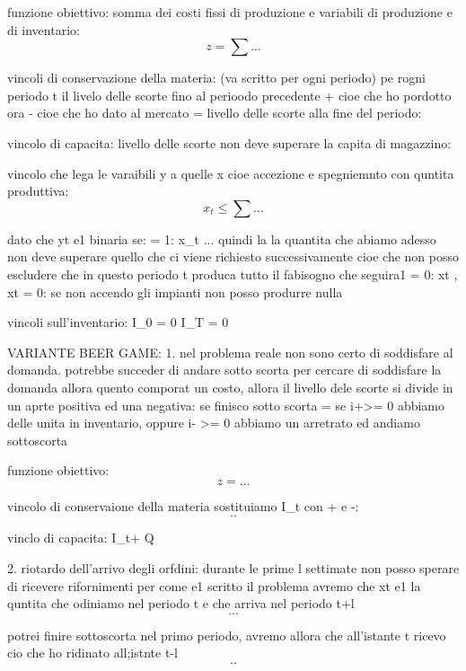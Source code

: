 funzione obiettivo:
somma dei costi fissi di produzione e variabili di produzione e di inventario:
$$z = \sum ...$$


vincoli di conservazione della materia: (va scritto per ogni periodo)
pe rogni periodo t il livelo delle scorte fino al perioodo precedente + cioe che ho pordotto ora - cioe che ho dato al mercato = livello delle scorte alla fine del periodo:


vincolo di capacita:
livello delle scorte non deve superare la capita di magazzino:


vincolo che lega le varaibili y a quelle x cioe accezione e spegniemnto con quntita produttiva:
$$x_t \leq \sum ...$$

dato che yt e1 binaria se: 
= 1: x_t \leq \sum ... quindi la la quantita che abiamo adesso non deve superare quello che ci viene richiesto successivamente cioe che non posso escludere che in questo periodo t produca tutto il fabisogno che seguira1
= 0: xt , xt = 0: se non accendo gli impianti non posso produrre nulla


vincoli sull'inventario:
I_0 = 0
I_T = 0





VARIANTE BEER GAME:
1. nel problema reale non sono certo di soddisfare al domanda. potrebbe succeder di andare sotto scorta per cercare di soddisfare la domanda allora quento comporat un costo, allora il livello dele scorte si divide in un aprte positiva ed una negativa:  se finisco sotto scorta = se i+>= 0 abbiamo delle unita in inventario, oppure i- >= 0 abbiamo un arretrato ed andiamo sottoscorta

funzione obiettivo:
$$z = ...$$

vincolo di conservaione della materia sostituiamo I_t con + e -:
$$..$$

vinclo di capacita:
I_t+ \leq Q


2. riotardo dell'arrivo degli orfdini: durante le prime l settimate non posso sperare di ricevere rifornimenti per come e1 scritto il problema avremo che xt e1 la quntita che odiniamo nel periodo t e che arriva nel periodo t+l
$$...$$

potrei finire sottoscorta nel primo periodo, avremo allora che all'istante t ricevo cio che ho ridinato all;istnte t-l
$$..$$
















